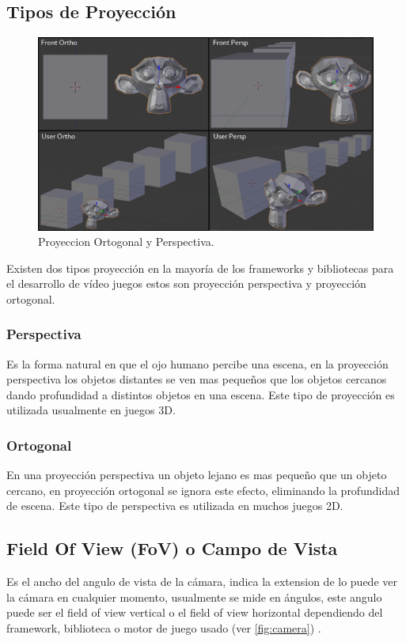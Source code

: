 \subsection{Tipos de Proyección}
\begin{figure}
\includegraphics[width=\linewidth]{semana2/projections.png}
\caption{Proyeccion Ortogonal y Perspectiva.}
\end{figure}
Existen dos tipos proyección en la mayoría de los frameworks y bibliotecas para el desarrollo de vídeo juegos estos son proyección perspectiva y proyección ortogonal.
\subsubsection{Perspectiva}
Es la forma natural en que el ojo humano percibe una escena, en la proyección perspectiva los objetos distantes se ven mas pequeños que los objetos cercanos dando profundidad a distintos objetos en una escena. Este tipo de proyección es utilizada usualmente en juegos 3D.
\subsubsection{Ortogonal}
En una proyección perspectiva un objeto lejano es mas pequeño que un objeto cercano, en proyección ortogonal se ignora este efecto, eliminando la profundidad de escena. Este tipo de perspectiva es utilizada en muchos juegos 2D.
\subsection{Field Of View (FoV) o Campo de Vista}
Es el ancho del angulo de vista de la cámara, indica la extension de lo puede ver la cámara en cualquier momento, usualmente se mide en ángulos, este angulo puede ser el field of view vertical o el field of view horizontal dependiendo del framework, biblioteca o motor de juego usado (ver \ref{fig:camera}) \cite{feng_fovy}.
